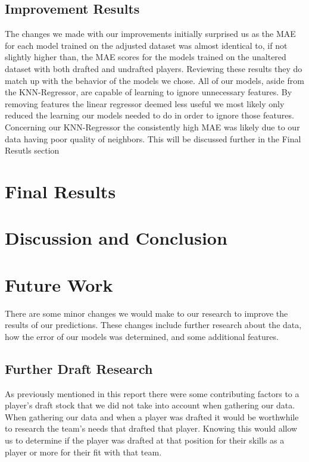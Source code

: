 \documentclass{article}
\begin{document}
\subsection{Improvement Results}
The changes we made with our improvements initially surprised us as the MAE for
each model trained on the adjusted dataset was almost identical to, if not
slightly higher than, the MAE scores for the models trained on the unaltered
dataset with both drafted and undrafted players. Reviewing these results they do
match up with the behavior of the models we chose. All of our models, aside from
the KNN-Regressor, are capable of learning to ignore unnecessary features. By
removing features the linear regressor deemed less useful we most likely only
reduced the learning our models needed to do in order to ignore those features.
Concerning our KNN-Regressor the consistently high MAE was likely due to our
data having poor quality of neighbors. This will be discussed further in the
Final Resutls section

\section{Final Results}

\section{Discussion and Conclusion}

\section{Future Work}

There are some minor changes we would make to our research to improve the
results of our predictions. These changes include further research about the
data, how the error of our models was determined, and some additional features.

\subsection{Further Draft Research}

As previously mentioned in this report there were some contributing factors to a
player’s draft stock that we did not take into account when gathering our data.
When gathering our data and when a player was drafted it would be worthwhile to
research the team’s needs that drafted that player. Knowing this would allow us
to determine if the player was drafted at that position for their skills as a
player or more for their fit with that team.
\end{document}
